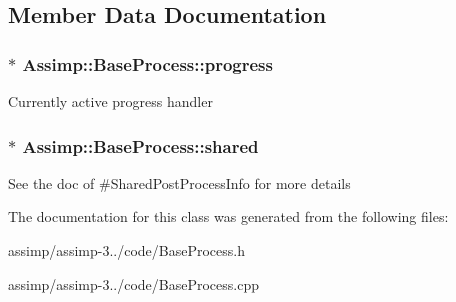 \subsection{Member Data Documentation}
\hypertarget{class_assimp_1_1_base_process_ae991035bf032d0195d4105d6ae5cbccb}{
\subsubsection[{progress}]{$\ast$ Assimp\+::\+Base\+Process\+::progress\hspace{0.3cm}{\ttfamily [protected]}}}\label{class_assimp_1_1_base_process_ae991035bf032d0195d4105d6ae5cbccb}
Currently active progress handler \hypertarget{class_assimp_1_1_base_process_a33a948aaeca9a6e237669188c0462bdd}{
\subsubsection[{shared}]{$\ast$ Assimp\+::\+Base\+Process\+::shared\hspace{0.3cm}{\ttfamily [protected]}}}\label{class_assimp_1_1_base_process_a33a948aaeca9a6e237669188c0462bdd}
See the doc of \#\+Shared\+Post\+Process\+Info for more details 

The documentation for this class was generated from the following files\+:\begin{DoxyCompactItemize}
\item 
assimp/assimp-\/3../code/Base\+Process.\+h\item 
assimp/assimp-\/3../code/Base\+Process.\+cpp\end{DoxyCompactItemize}
